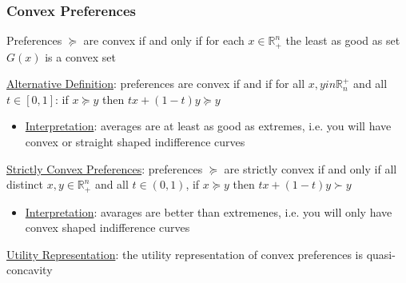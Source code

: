 \documentclass{article}
\begin{document}
\subsubsection{Convex Preferences}
Preferences $\succeq$ are convex if and only if for each $x \in \mathbb{R}_{+}^{n}$ the least as good as set $G(x)$ is a convex set \par \vspace{0.3em}
  \underline{Alternative Definition}: preferences are convex if and if for all $x, yin \mathbb{R}_{n}^{+}$ and all $t \in [0,1]$: if $x \succeq y$ then $tx + (1-t)y \succeq y$
  \begin{itemize}
    \item  \underline{Interpretation}: averages are at least as good as extremes, i.e. you will have convex or straight shaped indifference curves
  \end{itemize}
  \par
  \underline{Strictly Convex Preferences}: preferences $\succeq$ are strictly convex if and only if all distinct $x,y \in \mathbb{R}_{+}^{n}$ and all $t \in (0,1)$, if $x \succeq y$ then $tx + (1-t)y \succ y$
  \begin{itemize}
    \item  \underline{Interpretation}: avarages are better than extremenes, i.e. you will only have convex shaped indifference curves
  \end{itemize}
  \par
  \underline{Utility Representation}: the utility representation of convex preferences is quasi-concavity
  \par
\vspace{6mm}
\end{document}
